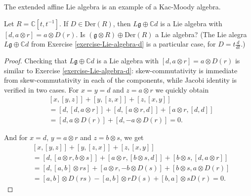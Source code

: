 The extended affine Lie algebra is an example of a Kac-Moody algebra.

\begin{exercise}
\label{exercise-for-those-who-like-geometry}
Let $R=\mathbb{C}[t,t^{-1}]$. 
If $D \in \text{Der}(R)$, then
$L\mathfrak{g} \oplus \mathbb{C}d$ is a Lie algebra with 
$[d,a \otimes r]=a\otimes D(r)$. 
Is $(\mathfrak{g}\otimes R)\oplus \text{Der}(R)$ a Lie algebra? (The Lie alegra
$L\mathfrak{g} \oplus \mathbb{C}d$ from Exercise \ref{exercise-Lie-algebra-d} is
a particular case, for $D=t\frac{d}{dt}$.)
\end{exercise}

\begin{proof}
Checking that $L\mathfrak{g} \oplus \mathbb{C}d$ is a Lie algebra with 
$[d,a\otimes r]=a \otimes D(r)$ is similar to Exercise
\ref{exercise-Lie-algebra-d}: skew-commutativity is immediate from
skew-commutativity in each of the components, while 
Jacobi identity is verified in two cases. For $x=y=d$ and $z=a \otimes r$ 
we quickly obtain
\begin{align*}
&[x,[y,z]]+[y,[z,x]]+[z,[x,y]]\\
&=[d,[d,a \otimes r]]+[d,[a \otimes r,d]]+[a \otimes r,[d,d]]\\
&=[d,a \otimes D(r)]+[d,-a \otimes D(r)]=0.
\end{align*}

And for $x=d$, $y=a \otimes r$ and $z=b \otimes s$, we get
\begin{equation}
\label{equation-Jacobi-derivation}
\begin{aligned}
&[x,[y,z]]+[y,[z,x]]+[z,[x,y]]\\
&=[d,[a\otimes r,b \otimes s]]+[a\otimes r,[b \otimes s,d]]
+[b \otimes s,[d,a\otimes r]]\\
&=[d,[a,b]\otimes rs]+[a\otimes r,-b\otimes D(s)]
+[b\otimes s,a\otimes D(r)]\\
&=[a,b]\otimes D(rs)-[a,b]\otimes rD(s)+[b,a]\otimes sD(r)=0.
\end{aligned}
\end{equation}


\end{proof}
